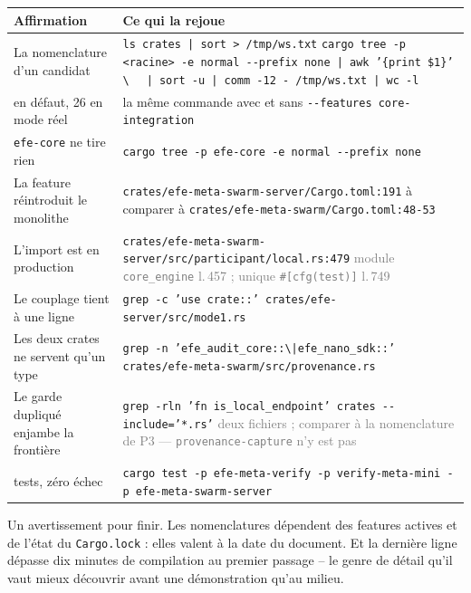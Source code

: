 \documentclass[10pt]{article}
\newcommand{\sz}[1]{\textcolor{grey}{\small\textsf{#1}}}
\newcommand{\code}[1]{\texttt{\small #1}}
\begin{document}
\renewcommand{\arraystretch}{1.22}
\begin{center}\small
\begin{tabular}{@{}>{\raggedright\arraybackslash}p{5.1cm} >{\raggedright\arraybackslash}p{11.0cm}@{}}
\toprule
\textbf{Affirmation} & \textbf{Ce qui la rejoue} \\
\midrule
La nomenclature d'un candidat &
  \code{ls crates | sort > /tmp/ws.txt} \newline
  \code{cargo tree -p <racine> -e normal -{}-prefix none | awk '\{print \$1\}' \textbackslash} \newline
  \code{\ \ | sort -u | comm -12 - /tmp/ws.txt | wc -l} \\
7 en défaut, 26 en mode réel &
  la même commande avec et sans \code{-{}-features core-integration} \\
\code{efe-core} ne tire rien &
  \code{cargo tree -p efe-core -e normal -{}-prefix none} \\
La feature réintroduit le monolithe &
  \code{crates/efe-meta-swarm-server/Cargo.toml:191} \newline
  à comparer à \code{crates/efe-meta-swarm/Cargo.toml:48-53} \\
L'import est en production &
  \code{crates/efe-meta-swarm-server/src/participant/local.rs:479} \newline
  \sz{module \code{core\_engine} l.\,457 ; unique \code{\#[cfg(test)]} l.\,749} \\
Le couplage tient à une ligne &
  \code{grep -c 'use crate::' crates/efe-server/src/mode1.rs} \\
Les deux crates ne servent qu'un type &
  \code{grep -n 'efe\_audit\_core::\textbackslash|efe\_nano\_sdk::' crates/efe-meta-swarm/src/provenance.rs} \\
Le garde dupliqué enjambe la frontière &
  \code{grep -rln 'fn is\_local\_endpoint' crates -{}-include='*.rs'} \newline
  \sz{deux fichiers ; comparer à la nomenclature de P3 --- \code{provenance-capture} n'y est pas} \\
515 tests, zéro échec &
  \code{cargo test -p efe-meta-verify -p verify-meta-mini -p efe-meta-swarm-server} \\
\bottomrule
\end{tabular}
\end{center}

Un avertissement pour finir. Les nomenclatures dépendent des features actives et de l'état du
\code{Cargo.lock} : elles valent à la date du document. Et la dernière ligne dépasse dix minutes de
compilation au premier passage -- le genre de détail qu'il vaut mieux découvrir avant une démonstration
qu'au milieu.
\end{document}
